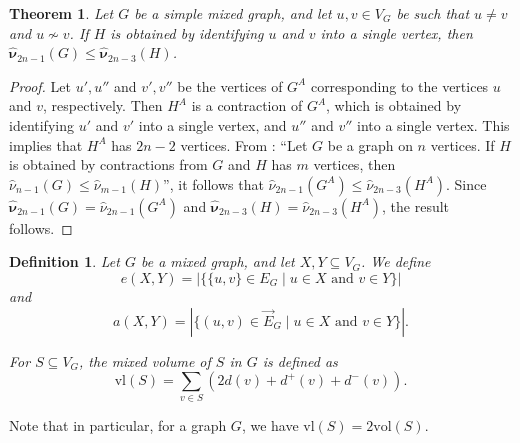 \documentclass[12pt]{article}
\numberwithin{equation}{section}
\newtheorem{thm}{Theorem}[section]
\newtheorem{defn}{Definition}[section]
\begin{document}
	\begin{thm}
		Let $G$ be a simple mixed graph, and let $u,v\in V_G$ be such that $u\neq v$ and $u\not\sim v$. If $H$ is obtained by identifying $u$ and $v$ into a single vertex, then $\hat{\bm{\nu}}_{2n-1}(G)\leq\hat{\bm{\nu}}_{2n-3}(H)$.
	\end{thm}
	\begin{proof}
		Let $u',u''$ and $v',v''$ be the vertices of $G^A$ corresponding to the vertices $u$ and $v$, respectively. Then $H^A$ is a contraction of $G^A$, which is obtained by identifying $u'$ and $v'$ into a single vertex, and $u''$ and $v''$ into a single vertex. This implies that $H^A$ has $2n-2$ vertices. From \cite[Lemma~1.15]{chung}: ``Let $G$ be a graph on $n$ vertices. If $H$ is obtained by contractions from $G$ and $H$ has $m$ vertices, then $\hat{\nu}_{n-1}(G)\leq\hat{\nu}_{m-1}(H)$'', it follows that $\hat{\nu}_{2n-1}(G^A)\leq\hat{\nu}_{2n-3}(H^A)$. Since $\hat{\bm{\nu}}_{2n-1}(G)=\hat{\nu}_{2n-1}(G^A)$ and $\hat{\bm{\nu}}_{2n-3}(H)=\hat{\nu}_{2n-3}(H^A)$, the result follows.
	\end{proof}
	\begin{defn}\normalfont
		Let $G$ be a mixed graph, and let $X,Y\subseteq V_G$. We define $$e(X,Y)=|\{\{u,v\}\in E_G\mid u\in X\text{ and }v\in Y\}|$$ and $$a(X,Y)=|\{(u,v)\in \vec{E}_G\mid u\in X\text{ and }v\in Y\}|.$$
		
		For $S\subseteq V_G$,  the \textit{mixed volume of $S$ in $G$} is defined as $$\text{vl}(S)=\sum_{v\in S}(2d(v)+d^+(v)+d^-(v)).$$
	\end{defn} 
	
	Note that in particular, for a graph $G$, we have $\text{vl}(S)=2\text{vol}(S)$.
	
\end{document}
